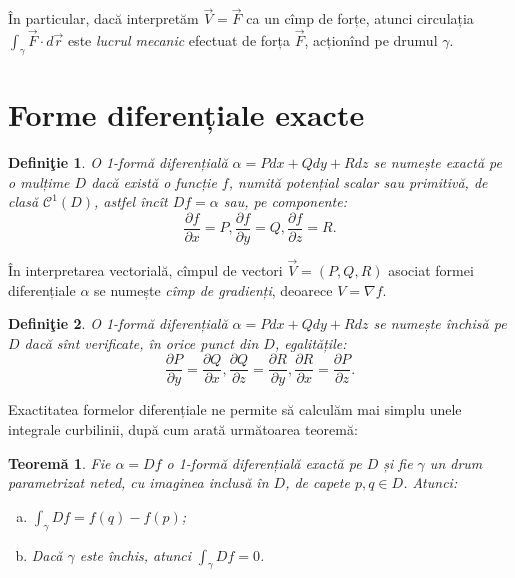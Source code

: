 \documentclass[11pt,a4paper]{article}
\newcommand\kal{\mathcal}
\newcommand\ds{\displaystyle}
\theoremstyle{dotless}
\newtheorem{theorem}{Teorem\u{a}}[section]
\theoremstyle{dotlessdr}
\newtheorem{definition}{Defini\c{t}ie}[section]
\begin{document}
În particular, dacă interpretăm $\vec{V} = \vec{F}$ ca un cîmp de forțe, atunci
circulația $\int_\gamma \vec{F} \cdot d \vec{r}$ este \emph{lucrul mecanic} efectuat
de forța $\vec{F}$, acționînd pe drumul $\gamma$.


\section{Forme diferențiale exacte}
\label{sec:exact}

\begin{definition}\label{def:exact}
  O 1-formă diferențială $\alpha = P dx + Q dy + R dz$ se numește \emph{exactă} pe o
  mulțime $D$ dacă există o funcție $f$, numită \emph{potențial scalar} sau
  \emph{primitivă}, de clasă $\kal{C}^1(D)$, astfel încît $Df = \alpha$ sau,
  pe componente:
  \[
    \frac{\partial f}{\partial x} = P, \frac{\partial f}{\partial y} = Q, %
    \frac{\partial f}{\partial z} = R.
  \]
\end{definition}

În interpretarea vectorială, cîmpul de vectori $\vec{V} = (P, Q, R)$ asociat formei
diferențiale $\alpha$ se numește \emph{cîmp de gradienți}, deoarece $V = \nabla f$.

\begin{definition}\label{def:inchis}
  O 1-formă diferențială $\alpha = P dx + Q dy + R dz$ se numește \emph{închisă} pe $D$
  dacă sînt verificate, în orice punct din $D$, egalitățile:
  \[
    \frac{\partial P}{\partial y} = \frac{\partial Q}{\partial x}, %
    \frac{\partial Q}{\partial z} = \frac{\partial R}{\partial y}, %
    \frac{\partial R}{\partial x} = \frac{\partial P}{\partial z}.
  \]
\end{definition}

Exactitatea formelor diferențiale ne permite să calculăm mai simplu unele
integrale curbilinii, după cum arată următoarea teoremă:

\begin{theorem}\label{thm:indep-drum}
  Fie $\alpha = Df$ o 1-formă diferențială exactă pe $D$ și fie $\gamma$ un drum
  parametrizat neted, cu imaginea inclusă în $D$, de capete $p, q \in D$. Atunci:
  \begin{enumerate}[(a)]
  \item $\ds\int_\gamma Df = f(q) - f(p)$;
  \item Dacă $\gamma$ este închis, atunci $\int_\gamma Df = 0$.
  \end{enumerate}
\end{theorem}
\end{document}

